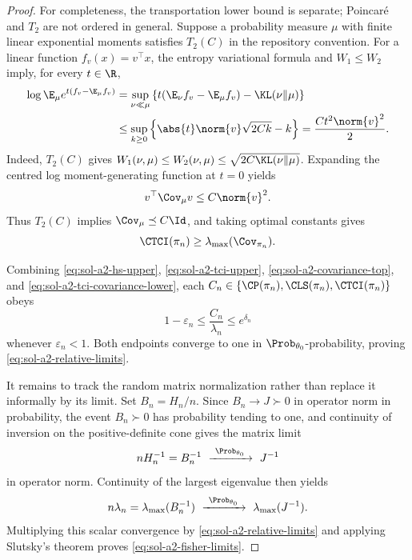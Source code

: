 \documentclass[../main.tex]{subfiles}
\begin{document}
\begin{proof}
For completeness, the transportation lower bound is separate; Poincar\'e and $T_2$ are not
ordered in general.  Suppose a probability measure $\mu$ with finite linear exponential moments
satisfies $T_2(C)$ in the repository convention.  For a linear function
$f_v(x)=v^\top x$, the entropy
variational formula and $W_1\le W_2$ imply, for every $t\in\R$,
\begin{align*}
 \log\E_\mu e^{t(f_v-\E_\mu f_v)}
 &=\sup_{\nu\ll\mu}
   \left\{t(\E_\nu f_v-\E_\mu f_v)-\KL(\nu\|\mu)\right\}\\
 &\le\sup_{k\ge0}
   \left\{\abs{t}\norm{v}\sqrt{2Ck}-k\right\}
 =\frac{Ct^2\norm{v}^2}{2}.
\end{align*}
Indeed, $T_2(C)$ gives
$W_1(\nu,\mu)\le W_2(\nu,\mu)\le\sqrt{2C\KL(\nu\|\mu)}$.
Expanding the centred log moment-generating function at $t=0$ yields
\[
 v^\top\Cov_\mu v\le C\norm{v}^2.
\]
Thus $T_2(C)$ implies $\Cov_\mu\preceq C\Id$, and taking optimal constants gives
\begin{equation}
\label{eq:sol-a2-tci-covariance-lower}
 \CTCI(\pi_n)\ge\lambda_{\max}(\Cov_{\pi_n}).
\end{equation}

Combining \eqref{eq:sol-a2-hs-upper}, \eqref{eq:sol-a2-tci-upper},
\eqref{eq:sol-a2-covariance-top}, and
\eqref{eq:sol-a2-tci-covariance-lower}, each
$C_n\in\{\CP(\pi_n),\CLS(\pi_n),\CTCI(\pi_n)\}$ obeys
\begin{equation}
\label{eq:sol-a2-final-sandwich}
 1-\varepsilon_n
 \le\frac{C_n}{\lambda_n}
 \le e^{\delta_n}
\end{equation}
whenever $\varepsilon_n<1$.  Both endpoints converge to one in
$\Prob_{\theta_0}$-probability, proving \eqref{eq:sol-a2-relative-limits}.

It remains to track the random matrix normalization rather than replace it informally by its
limit.  Set $B_n=H_n/n$.  Since $B_n\to J\succ0$ in operator norm in probability, the event
$B_n\succ0$ has probability tending to one, and continuity of inversion on the positive-definite
cone gives the matrix limit
\begin{equation}
\label{eq:sol-a2-matrix-limit}
 nH_n^{-1}=B_n^{-1}
 \ \xrightarrow{\ \Prob_{\theta_0}\ }\ J^{-1}
\end{equation}
in operator norm.  Continuity of the largest eigenvalue then yields
\[
 n\lambda_n=\lambda_{\max}(B_n^{-1})
 \ \xrightarrow{\ \Prob_{\theta_0}\ }\
 \lambda_{\max}(J^{-1}).
\]
Multiplying this scalar convergence by
\eqref{eq:sol-a2-relative-limits} and applying Slutsky's theorem proves
\eqref{eq:sol-a2-fisher-limits}.
\end{proof}
\end{document}
